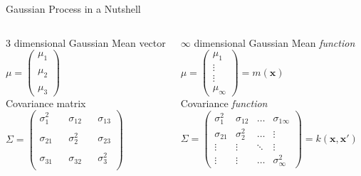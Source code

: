 \documentclass[pdf]{beamer}
\begin{document}
\begin{frame}{Gaussian Process in a Nutshell}
\small
\begin{columns}
\begin{block}{3 dimensional Gaussian}
Mean vector
\\[0.2cm]
$\mu = 
\begin{pmatrix}
\mu_1 \\ \\ \mu_2 \\ \\ \mu_3
\end{pmatrix}
$
\\[0.6cm]
Covariance matrix
\\[0.4cm]
$\Sigma = 
\begin{pmatrix}
  	\sigma^2_1 & & \sigma_{12} & & \sigma_{13}\\
  	& & & & \\	
  	\sigma_{21} & & \sigma^2_2 & & \sigma_{23} \\
	& & & & \\
	\sigma_{31} & & \sigma_{32} & & \sigma^2_3 \\
\end{pmatrix}
$
\end{block}

\begin{block}{$\infty$ dimensional Gaussian}
Mean \textit{function}
\\[0.2cm]
$\mu = 
\begin{pmatrix}
\mu_1 \\ \vdots \\ \vdots \\ \mu_\infty
\end{pmatrix}
= m(\mathbf{x})
$
\\[0.5cm]
Covariance \textit{function}
\\[0.2cm]
$\Sigma = 
\begin{pmatrix}
  	\sigma^2_1 		& \sigma_{12}  		& \hdots & \sigma_{1\infty}\\
  	\sigma_{21}		& \sigma^2_2 		& \hdots & \vdots \\
	\vdots 			& \vdots 			& \ddots & \vdots \\
	\vdots 			& \vdots 			& \hdots & \sigma^2_\infty
\end{pmatrix}
= k(\mathbf{x},\mathbf{x}')
$
\end{block}

\end{columns}

\end{frame}
\end{document}
